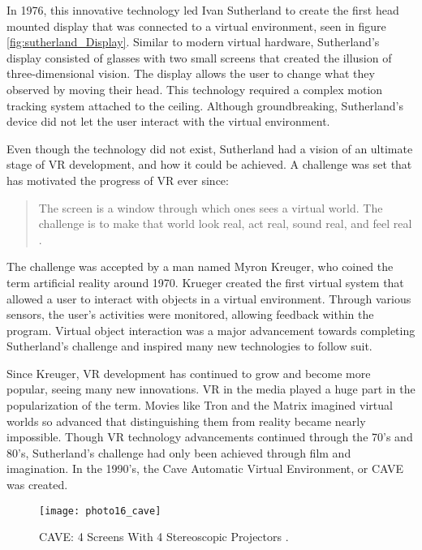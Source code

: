 \par In 1976, this innovative technology led Ivan Sutherland to create the first head mounted display that was connected to a virtual environment, seen in figure \ref{fig:sutherland_Display}. Similar to modern virtual hardware, Sutherland's display consisted of glasses with two small screens that created the illusion of three-dimensional vision. The display allows the user to change what they observed by moving their head. This technology required a complex motion tracking system attached to the ceiling. Although groundbreaking, Sutherland's device did not let the user interact with the virtual environment.

\par Even though the technology did not exist, Sutherland had a vision of an ultimate stage of VR development, and how it could be achieved. A challenge was set that has motivated the progress of VR ever since: 

\begin{quote}
	The screen is a window through which ones sees a virtual world. The challenge is to make that world look real, act real, sound real, and feel real  \cite{gobbetti}. 
\end{quote}

The challenge was accepted by a man named Myron Kreuger, who coined the term artificial reality around 1970. Krueger created the first virtual system that allowed a user to interact with objects in a virtual environment. Through various sensors, the user's activities were monitored, allowing feedback within the program. Virtual object interaction was a major advancement towards completing Sutherland's challenge and inspired many new technologies to follow suit.  

Since Kreuger, VR development has continued to grow and become more popular, seeing many new innovations. VR in the media played a huge part in the popularization of the term. Movies like Tron and the Matrix imagined virtual worlds so advanced that distinguishing them from reality became nearly impossible. Though VR technology advancements continued through the 70's and 80's, Sutherland's challenge had only been achieved through film and imagination. 
In the 1990's, the Cave Automatic Virtual Environment, or CAVE was created.

\begin{figure}[h]
	\centering
	\texttt{[image: photo16\_cave]}
	\caption{CAVE: 4 Screens With 4 Stereoscopic Projectors \cite{CAVE}.}
	\label{fig:cave}
\end{figure}


